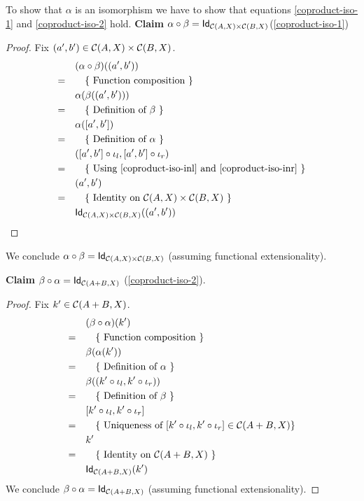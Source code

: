 \begin{solution}
To show that $\alpha$ is an isomorphism we have to show that equations \cref{coproduct-iso-1} and \cref{coproduct-iso-2} hold.
\textbf{Claim $\co {\beta} {\alpha} = \Id[\CQ]$}(\cref{coproduct-iso-1})
\begin{proof}
Fix $(a',b') \in \CQ$.
\begin{align*}
 &\quad (\co {\beta} {\alpha}) ((a',b'))\\
=&\qquad \text{\{ Function composition \}} \\
 &\quad \alpha(\beta((a',b'))) \\
=&\qquad \text{\{ Definition of $\beta$ \}} \\
 &\quad \alpha(\outofcoproduct{a'}{b'}) \\
=&\qquad \text{\{ Definition of $\alpha$ \}} \\
 &\quad (\co {\inl} {\outofcoproduct{a'}{b'}}, \co {\inr} {\outofcoproduct{a'}{b'}}) \\
=&\qquad \text{\{ Using \ref{coproduct-iso-inl} and \ref{coproduct-iso-inr} \}} \\
 &\quad (a', b') \\
=&\qquad \text{\{ Identity on $\CQ$ \}} \\
 &\quad \Id[\CQ]((a', b')) \\
\end{align*}
\end{proof}
We conclude $\co {\beta} {\alpha} = \Id[\CQ]$ (assuming functional extensionality).

\textbf{Claim $\co {\alpha} {\beta} = \Id[\CP]$} (\cref{coproduct-iso-2}).
\begin{proof}
Fix $k' \in \CP$.
\begin{align*}
 &\quad (\co {\alpha} {\beta}) (k')\\
=&\qquad \text{\{ Function composition \}} \\
 &\quad \beta(\alpha(k')) \\
=&\qquad \text{\{ Definition of $\alpha$ \}} \\
 &\quad \beta((\co {\inl} {k'}, \co {\inr} {k'}))\\
=&\qquad \text{\{ Definition of $\beta$ \}} \\
 &\quad \outofcoproduct{\co {\inl} {k'}}{\co {\inr} {k'}}\\
=&\qquad \text{\{ Uniqueness of $\outofcoproduct{\co {\inl} {k'}}{\co {\inr} {k'}} \in \CC(A+B,X) \}$} \\
 &\quad k'\\
=&\qquad \text{\{ Identity on $\CP$ \}} \\
 &\quad \Id[\CP] (k')
\end{align*}
We conclude $\co {\alpha} {\beta} = \Id[\CP]$ (assuming functional extensionality).
\end{proof}

\end{solution}


